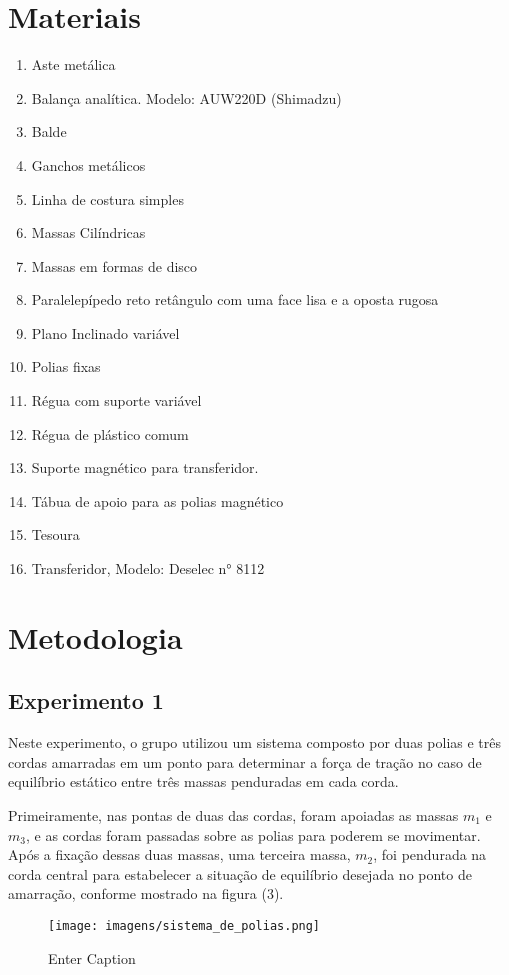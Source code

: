 \documentclass[12pt, letterpaper]{article}
\begin{document}
\section{Materiais}
\begin{enumerate}
   \item Aste metálica
    \item Balança analítica. Modelo: AUW220D (Shimadzu)
    \item Balde 
    \item Ganchos metálicos
    \item Linha de costura simples
    \item Massas Cilíndricas
    \item Massas em formas de disco
    \item Paralelepípedo reto retângulo com uma face lisa e a oposta rugosa
    \item Plano Inclinado variável
    \item Polias fixas
    \item Régua com suporte variável
    \item Régua de plástico comum
    \item Suporte magnético para transferidor.
    \item Tábua de apoio para as polias magnético
    \item Tesoura
    \item Transferidor, Modelo: Deselec n° 8112
\end{enumerate}

\section{Metodologia}
\subsection{Experimento 1}
    Neste experimento, o grupo utilizou um sistema composto por duas polias e três cordas amarradas em um ponto para determinar a força de tração no caso de equilíbrio estático entre três massas penduradas em cada corda.

    Primeiramente, nas pontas de duas das cordas, foram apoiadas as massas $ m_{1}$ e $m_{3}$, e as cordas foram passadas sobre as polias para poderem se movimentar. Após a fixação dessas duas massas, uma terceira massa, $m_{2}$, foi pendurada na corda central para estabelecer a situação de equilíbrio desejada no ponto de amarração, conforme mostrado na figura (3).
    \begin{figure}[!h]
        \centering
        \texttt{[image: imagens/sistema\_de\_polias.png]}
        \caption{Enter Caption}
        \label{fig:enter-label}
    \end{figure}
    
\end{document}
